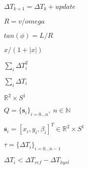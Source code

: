 \documentclass{article}
\begin{document}
$ \Delta T_{k+1} = \Delta T_k + update $
\pagebreak

$ R = v/omega $
\pagebreak

$ tan(\phi) = L/R $
\pagebreak

$ x / (1 + |x|) $
\pagebreak

$ \sum_i \Delta T_i^2 $
\pagebreak

$ \sum_i \Delta T_i $
\pagebreak

$ \mathbb{R}^2 \times S^1 $
\pagebreak

$ Q = \lbrace \mathbf{s}_i \rbrace_{i=0...n},\ n \in \mathbb{N} $
\pagebreak

$ \mathbf{s}_i = [x_i, y_i, \beta_i]^T \in \mathbb{R}^2 \times S^1 $
\pagebreak

$ \tau = \lbrace \Delta T_i \rbrace_{i=0...n-1} $
\pagebreak

$ \Delta T_i < \Delta T_{ref} - \Delta T_{hyst} $
\pagebreak
\end{document}
